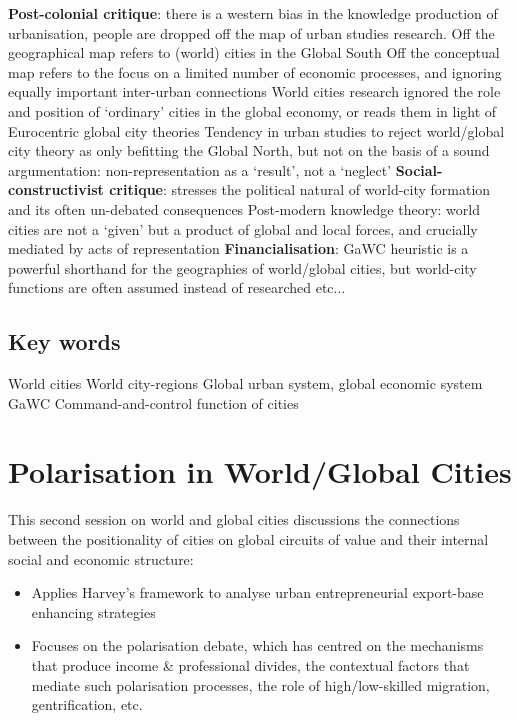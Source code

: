 \documentclass{article}
\begin{document}
\begin{outline}
	\1 \textbf{Post-colonial critique}: there is a western bias in the knowledge production of urbanisation, people are dropped off the map of urban studies research. 
		\2 Off the geographical map refers to (world) cities in the Global South
		\2 Off the conceptual map refers to the focus on a limited number of economic processes, and ignoring equally important inter-urban connections
		\2 World cities research ignored the role and position of `ordinary' cities in the global economy,  or reads them in light of Eurocentric global city theories 
		\2 Tendency in urban studies to reject world/global city theory as only befitting the Global North, but not on the basis of a sound argumentation: non-representation as a `result', not a `neglect'
	\1 \textbf{Social-constructivist critique}: stresses the political natural of world-city formation and its often un-debated consequences
		\2 Post-modern knowledge theory: world cities are not a `given' but a product of global and local forces, and crucially mediated by acts of representation
	\1 \textbf{Financialisation}: GaWC heuristic is a powerful shorthand for the geographies of world/global cities, but world-city functions are often assumed instead of researched 
		\2 etc...		
\end{outline}

\subsection{Key words}

World cities
World city-regions
Global urban system, global economic system
GaWC
Command-and-control function of cities


\pagebreak\section{Polarisation in World/Global Cities}

This second session on world and global cities discussions the connections between the positionality of cities on global circuits of value and their internal social and economic structure:
\begin{itemize}
  \item Applies Harvey's framework to analyse urban  entrepreneurial export-base enhancing strategies
  \item Focuses on the polarisation debate, which has centred on the mechanisms that produce income \& professional divides, the contextual factors that mediate such polarisation processes, the role of high/low-skilled migration, gentrification, etc.
\end{itemize}
\end{document}
